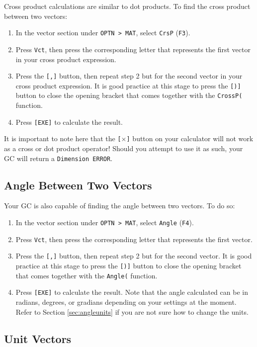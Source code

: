 \documentclass[a5paper]{memoir}
\def\code#1{\texttt{#1}}
\def\fthree{(\code{F3})}
\def\ffour{(\code{F4})}
\begin{document}
Cross product calculations are similar to dot products. To find the cross product between two vectors:

\begin{enumerate}
	\item In the vector section under \code{OPTN > MAT}, select \code{CrsP} \fthree.
	\item Press \code{Vct}, then press the corresponding letter that represents the first vector in your cross product expression.
	\item Press the \code{[,]} button, then repeat step 2 but for the second vector in your cross product expression. It is good practice at this stage to press the \code{[)]} button to close the opening bracket that comes together with the \code{CrossP(} function.
	\item Press \code{[EXE]} to calculate the result.
\end{enumerate}

It is important to note here that the \code{[$\times$]} button on your calculator will not work as a cross or dot product operator! Should you attempt to use it as such, your GC will return a \code{Dimension ERROR}.

\subsection{Angle Between Two Vectors}

Your GC is also capable of finding the angle between two vectors. To do so:

\begin{enumerate}
	\item In the vector section under \code{OPTN > MAT}, select \code{Angle} \ffour.
	\item Press \code{Vct}, then press the corresponding letter that represents the first vector.
	\item Press the \code{[,]} button, then repeat step 2 but for the second vector. It is good practice at this stage to press the \code{[)]} button to close the opening bracket that comes together with the \code{Angle(} function.
	\item Press \code{[EXE]} to calculate the result. Note that the angle calculated can be in radians, degrees, or gradians depending on your settings at the moment. Refer to Section \ref{sec:angleunits} if you are not sure how to change the units.
\end{enumerate}

\subsection{Unit Vectors}
\end{document}
